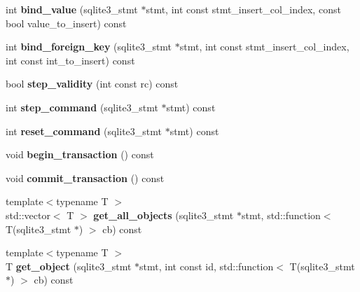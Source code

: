 \begin{DoxyCompactItemize}
int {\bfseries bind\+\_\+value} (sqlite3\+\_\+stmt $\ast$stmt, int const stmt\+\_\+insert\+\_\+col\+\_\+index, const bool value\+\_\+to\+\_\+insert) const
\item 
\mbox{\label{class_s_q_lite_wrapper_a21b4c5733febabb2a4f21772b7cfdec1}} 
int {\bfseries bind\+\_\+foreign\+\_\+key} (sqlite3\+\_\+stmt $\ast$stmt, int const stmt\+\_\+insert\+\_\+col\+\_\+index, int const int\+\_\+to\+\_\+insert) const
\item 
\mbox{\label{class_s_q_lite_wrapper_a2c0169834d2518ede1f00b92ffbed3e2}} 
bool {\bfseries step\+\_\+validity} (int const rc) const
\item 
\mbox{\label{class_s_q_lite_wrapper_aed2fd5a33db820461662e6ffdc05808b}} 
int {\bfseries step\+\_\+command} (sqlite3\+\_\+stmt $\ast$stmt) const
\item 
\mbox{\label{class_s_q_lite_wrapper_aeef995f134463b92babcd805444a1783}} 
int {\bfseries reset\+\_\+command} (sqlite3\+\_\+stmt $\ast$stmt) const
\item 
\mbox{\label{class_s_q_lite_wrapper_a7390f800549dbb01bb6bea58f3834c0c}} 
void {\bfseries begin\+\_\+transaction} () const
\item 
\mbox{\label{class_s_q_lite_wrapper_a80905f75cc7115658a61037a4c7a2e62}} 
void {\bfseries commit\+\_\+transaction} () const
\item 
\mbox{\label{class_s_q_lite_wrapper_ad729120a855cf8db16940f9798897cc5}} 
{\footnotesize template$<$typename T $>$ }\\std\+::vector$<$ T $>$ {\bfseries get\+\_\+all\+\_\+objects} (sqlite3\+\_\+stmt $\ast$stmt, std\+::function$<$ T(sqlite3\+\_\+stmt $\ast$) $>$ cb) const
\item 
\mbox{\label{class_s_q_lite_wrapper_a7b08d5d170b1c19f7a0be0ecdec4195e}} 
{\footnotesize template$<$typename T $>$ }\\T {\bfseries get\+\_\+object} (sqlite3\+\_\+stmt $\ast$stmt, int const id, std\+::function$<$ T(sqlite3\+\_\+stmt $\ast$) $>$ cb) const
\end{DoxyCompactItemize}
